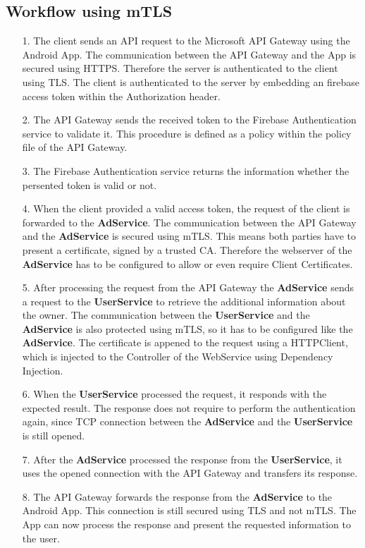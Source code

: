 \subsection{Workflow using mTLS}
\begin{enumerate}
	\item[1.] The client sends an API request to the Microsoft API Gateway using the Android App.
		The communication between the API Gateway and the App is secured using HTTPS.
		Therefore the server is authenticated to the client using TLS.
		The client is authenticated to the server by embedding an firebase access token within the Authorization header.
	\item[2.] The API Gateway sends the received token to the Firebase Authentication service to validate it.
		This procedure is defined as a policy within the policy file of the API Gateway.
	\item[3.] The Firebase Authentication service returns the information whether the persented token is valid or not.
	\item[4.] When the client provided a valid access token, the request of the client is forwarded to the \textbf{AdService}.
		The communication between the API Gateway and the \textbf{AdService} is secured using mTLS.
		This means both parties have to present a certificate, signed by a trusted CA.
		Therefore the webserver of the \textbf{AdService} has to be configured to allow or even require Client Certificates.
	\item[5.] After processing the request from the API Gateway the \textbf{AdService} sends a request to the \textbf{UserService} to retrieve the additional information about the owner.
		The communication between the \textbf{UserService} and the \textbf{AdService} is also protected using mTLS, so it has to be configured like the \textbf{AdService}.
		The certificate is appened to the request using a HTTPClient, which is injected to the Controller of the WebService using Dependency Injection.
	\item[6.] When the \textbf{UserService} processed the request, it responds with the expected result.
		The response does not require to perform the authentication again, since TCP connection between the \textbf{AdService} and the \textbf{UserService} is still opened.
	\item[7.] After the \textbf{AdService} processed the response from the \textbf{UserService}, it uses the opened connection with the API Gateway and transfers its response.
	\item[8.] The API Gateway forwards the response from the \textbf{AdService} to the Android App.
		This connection is still secured using TLS and not mTLS.
		The App can now process the response and present the requested information to the user.
\end{enumerate}

